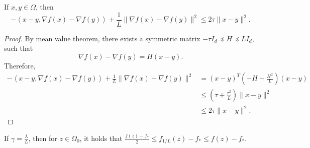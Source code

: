 \documentclass{article} %
\numberwithin{equation}{section}
\begin{document}
\begin{lemma}\label{lem:wc_prop}
    If $x,y\in \Omega$, then
    \begin{equation}
        - \left\langle x-y, \nabla f(x)-\nabla f(y)\right\rangle + \frac{1}{L} \|\nabla f(x)-\nabla f(y)\|^2 \leq 2\tau\|x-y\|^2.
    \end{equation}
\end{lemma}

\begin{proof}
    By mean value theorem, there exists a symmetric matrix $-\tau I_d \preceq H \preceq L I_d$, such that
    \begin{equation}
        \nabla f(x) - \nabla f(y) = H(x-y).
    \end{equation}
    Therefore,
    \begin{equation}
        \begin{aligned}
            - \left\langle x-y, \nabla f(x)-\nabla f(y)\right\rangle + \frac{1}{L} \|\nabla f(x)-\nabla f(y)\|^2
            &= (x-y)^T(-H + \frac{H^2}{L})(x-y) \\
            &\leq (\tau+\frac{\tau^2}{L})\|x-y\|^2 \\
            &\leq 2\tau\|x-y\|^2.
        \end{aligned}
    \end{equation}
\end{proof}

\begin{lemma}\label{lem:moreau_1}
    If $\gamma=\frac{\lambda}{L}$, then for $z\in \Omega_0$, it holds that $\frac{f(z)-f_*}{2}\leq f_{1/L}(z)-f_*\leq f(z)-f_*$.
\end{lemma}
\end{document}
